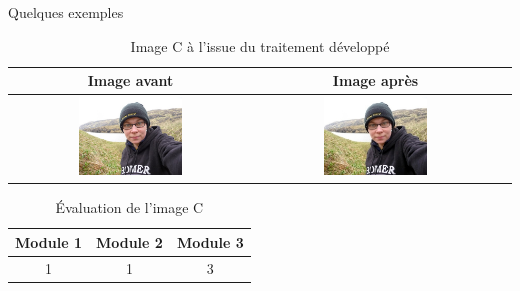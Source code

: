 \documentclass{beamer}
\begin{document}
\begin{frame}{Quelques exemples}
\begin{table}
\centering
\begin{tabular}{|c|c|c|}	
\hline \textbf{Image avant}  &  \textbf{Image après}  \\ \hline 
\includegraphics[width=0.45\textwidth]{Resultats/pc_avant} & \includegraphics[width=0.45\textwidth]{Resultats/pc_apres} \\ \hline   
\end{tabular}
\caption{Image C à l'issue du traitement développé}
\end{table}

\begin{table}[htbp]
\centering
\begin{tabular}{|c|c|c|}
\hline
Module 1 & Module 2 & Module 3\\ \hline
1 & 1 & 3\\ \hline
\end{tabular}
\caption{Évaluation de l'image C}
\end{table}

\end{frame}
\end{document}
